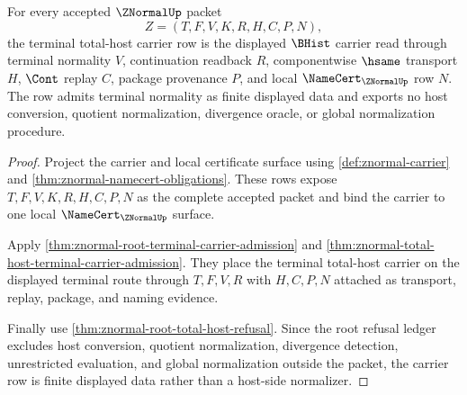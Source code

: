 \begin{theorem}
\label{thm:znormal-terminal-total-host-carrier-row}
For every accepted $\ZNormalUp$ packet
$$
Z=(T,F,V,K,R,H,C,P,N),
$$
the terminal total-host carrier row is the displayed $\BHist$ carrier read through terminal normality $V$, continuation readback $R$, componentwise $\hsame$ transport $H$, $\Cont$ replay $C$, package provenance $P$, and local $\NameCert_{\ZNormalUp}$ row $N$. The row admits terminal normality as finite displayed data and exports no host conversion, quotient normalization, divergence oracle, or global normalization procedure.
\end{theorem}
\begin{proof}
Project the carrier and local certificate surface using \autoref{def:znormal-carrier} and \autoref{thm:znormal-namecert-obligations}. These rows expose $T,F,V,K,R,H,C,P,N$ as the complete accepted packet and bind the carrier to one local $\NameCert_{\ZNormalUp}$ surface.

Apply \autoref{thm:znormal-root-terminal-carrier-admission} and \autoref{thm:znormal-total-host-terminal-carrier-admission}. They place the terminal total-host carrier on the displayed terminal route through $T,F,V,R$ with $H,C,P,N$ attached as transport, replay, package, and naming evidence.

Finally use \autoref{thm:znormal-root-total-host-refusal}. Since the root refusal ledger excludes host conversion, quotient normalization, divergence detection, unrestricted evaluation, and global normalization outside the packet, the carrier row is finite displayed data rather than a host-side normalizer.
\end{proof}

